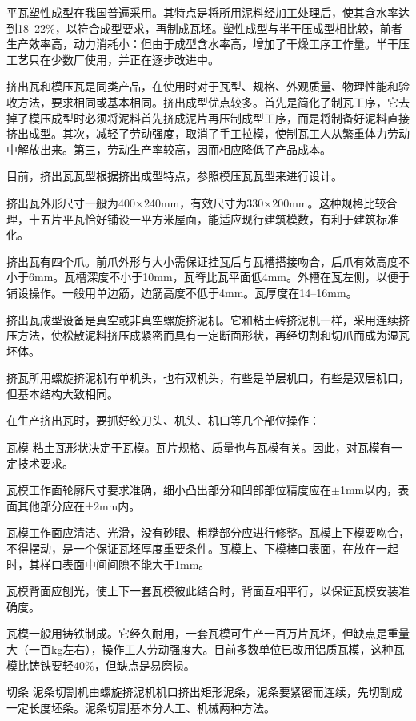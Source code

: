 \documentclass{ctexbook}
\begin{document}
平瓦塑性成型在我国普遍采用。其特点是将所用泥料经加工处理后，使其含水率达到18--22\%，以符合成型要求，再制成瓦坯。塑性成型与半干压成型相比较，前者生产效率高，动力消耗小：但由于成型含水率高，增加了干燥工序工作量。半干压工艺只在少数厂使用，并正在逐步改进中。

挤出瓦和模压瓦是同类产品，在使用时对于瓦型、规格、外观质量、物理性能和验收方法，要求相同或基本相同。挤出成型优点较多。首先是简化了制瓦工序，它去掉了模压成型时必须将泥料首先挤成泥片再压制成型工序，而是将制备好泥料直接挤出成型。其次，减轻了劳动强度，取消了手工拉模，使制瓦工人从繁重体力劳动中解放出来。第三，劳动生产率较高，因而相应降低了产品成本。

目前，挤出瓦瓦型根据挤出成型特点，参照模压瓦瓦型来进行设计。

挤出瓦外形尺寸一般为400$\times$240mm，有效尺寸为330$\times$200mm。这种规格比较合理，十五片平瓦恰好铺设一平方米屋面，能适应现行建筑模数，有利于建筑标准化。

挤出瓦有四个爪。前爪外形与大小需保证挂瓦后与瓦槽搭接吻合，后爪有效高度不小于6mm。瓦槽深度不小于10mm，瓦脊比瓦平面低4mm。外槽在瓦左侧，以便于铺设操作。一般用单边筋，边筋高度不低于4mm。瓦厚度在14--16mm。

挤出瓦成型设备是真空或非真空螺旋挤泥机。它和粘土砖挤泥机一样，采用连续挤压方法，使松散泥料挤压成紧密而具有一定断面形状，再经切割和切爪而成为湿瓦坯体。

挤瓦所用螺旋挤泥机有单机头，也有双机头，有些是单层机口，有些是双层机口，但基本结构大致相同。

在生产挤出瓦时，要抓好绞刀头、机头、机口等几个部位操作：

瓦模 粘土瓦形状决定于瓦模。瓦片规格、质量也与瓦模有关。因此，对瓦模有一定技术要求。

瓦模工作面轮廓尺寸要求准确，细小凸出部分和凹部部位精度应在$\pm$1mm以内，表面其他部分应在±2mm内。

瓦模工作面应清洁、光滑，没有砂眼、粗糙部分应进行修整。瓦模上下模要吻合，不得摆动，是一个保证瓦坯厚度重要条件。瓦模上、下模棒口表面，在放在一起时，其样口表面中间间隙不能大于1mm。

瓦模背面应刨光，使上下一套瓦模彼此结合时，背面互相平行，以保证瓦模安装准确度。

瓦模一般用铸铁制成。它经久耐用，一套瓦模可生产一百万片瓦坯，但缺点是重量大（一百kg左右），操作工人劳动强度大。目前多数单位已改用铝质瓦模，这种瓦模比铸铁要轻40\%，但缺点是易磨损。

切条 泥条切割机由螺旋挤泥机机口挤出矩形泥条，泥条要紧密而连续，先切割成一定长度坯条。泥条切割基本分人工、机械两种方法。
\end{document}

